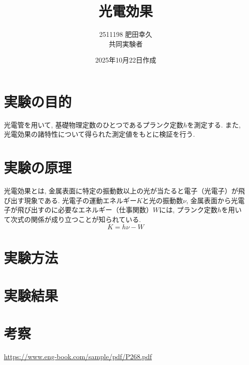 \documentclass{jarticle}
\title{光電効果}
\author{2511198 肥田幸久 \\ 共同実験者 \\ }
\date{2025年10月22日作成}
\begin{document}
\maketitle



\section{実験の目的}

光電管を用いて, 基礎物理定数のひとつであるプランク定数$h$を測定する.
また, 光電効果の諸特性について得られた測定値をもとに検証を行う.



\section{実験の原理}

光電効果とは, 金属表面に特定の振動数以上の光が当たると電子（光電子）が飛び出す現象である.
光電子の運動エネルギー$K$と光の振動数$\nu$, 金属表面から光電子が飛び出すのに必要なエネルギー（仕事関数）$W$には, プランク定数$h$を用いて次式の関係が成り立つことが知られている.
\begin{equation}
  K = h\nu - W
\end{equation}



\section{実験方法}



\section{実験結果}



\section{考察}



\begin{thebibliography}{99}

   \url{https://www.eng-book.com/sample/pdf/P268.pdf}

\end{thebibliography}
\end{document}

